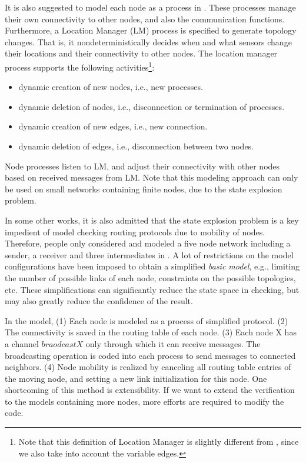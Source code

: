 \documentclass[a4paper,10pt,twocolumn]{article}
\begin{document}
It is also suggested to model each node as a process in \cite{Ole05}. These processes manage their own connectivity to other nodes, and also the communication functions. Furthermore, a Location Manager (LM) process is specified to generate topology changes. That is, it nondeterministically decides when and what sensors change their locations and their connectivity to other nodes. The location manager process supports the following activities\footnote{Note that this definition of Location Manager is slightly different from \cite{Ole05}, since we also take into account the variable edges.}:
\begin{itemize}
  \item dynamic creation of new nodes, i.e., new processes.
  \item dynamic deletion of nodes, i.e., disconnection or termination of processes.
  \item dynamic creation of new edges, i.e., new connection.
  \item dynamic deletion of edges, i.e., disconnection between two nodes.
\end{itemize}
Node processes listen to LM, and adjust their connectivity with other nodes based on received messages from LM. Note that this modeling approach can only be used on small networks containing finite nodes, due to the state explosion problem.

In some other works, it is also admitted that the state explosion problem is a key impedient of model checking routing protocols due to mobility of nodes. Therefore, people only considered and modeled a five node network including a sender, a receiver and three intermediates in \cite{RA04}. A lot of restrictions on the model configurations have been imposed to obtain a simplified \emph{basic model}, e.g., limiting the number of possible links of each node, constraints on the possible topologies, etc. These simplifications can significantly reduce the state space in checking, but may also greatly reduce the confidence of the result.

In the model, (1) Each node is modeled as a process of simplified protocol. (2) The connectivity is saved in the routing table of each node. (3) Each node X has a channel $braodcastX$ only through which it can receive messages. The broadcasting operation is coded into each process to send messages to connected neighbors. (4) Node mobility is realized by canceling all routing table entries of the moving node, and setting a new link initialization for this node. One shortcoming of this method is extensibility. If we want to extend the verification to the models containing more nodes, more efforts are required to modify the code.
\end{document}
